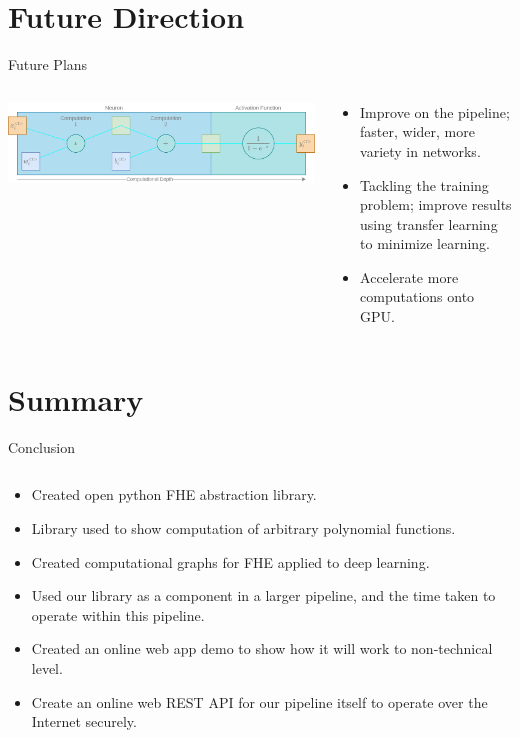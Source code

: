 \documentclass[aspectratio=169]{beamer}
\begin{document}
  \section{Future Direction}

    \begin{frame}{Future Plans}
      \begin{columns}
        \begin{column}{0.5\textwidth}
          \includegraphics[width=1\linewidth]{neuron.png}
        \end{column}
        \begin{column}{0.5\textwidth}
          \begin{itemize}
            \item Improve on the pipeline; faster, wider, more variety in networks.
            \item Tackling the training problem; improve results using  transfer learning to minimize learning.
            \item Accelerate more computations onto GPU.
          \end{itemize}
        \end{column}
      \end{columns}
    \end{frame}

  \section{Summary}

    \begin{frame}{Conclusion}
      \begin{columns}
        \begin{column}{0.5\textwidth}
          \begin{itemize}
            \item Created open python FHE abstraction library.
            \item Library used to show computation of arbitrary polynomial functions.
            \item Created computational graphs for FHE applied to deep learning.
            \item Used our library as a component in a larger pipeline, and the time taken to operate within this pipeline.
            \item Created an online web app demo to show how it will work to non-technical level.
            \item Create an online web REST API for our pipeline itself to operate over the Internet securely.
          \end{itemize}
        \end{column}
      \end{columns}
    \end{frame}
\end{document}
